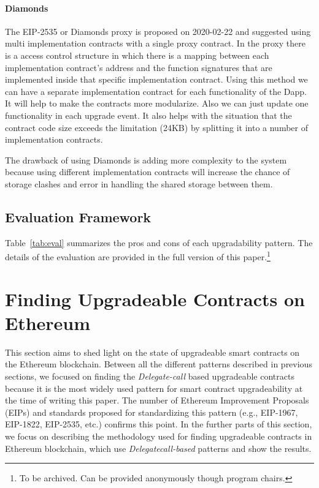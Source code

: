 \paragraph{Diamonds}
The EIP-2535 or Diamonds proxy is proposed on 2020-02-22 and suggested using multi implementation contracts with a single proxy contract. In the proxy there is a access control structure in which there is a mapping between each implementation contract's address and the function signatures that are implemented inside that specific implementation contract. Using this method we can have a separate implementation contract for each functionality of the Dapp. It will help to make the contracts more modularize. Also we can just update one functionality in each upgrade event. It also helps with the situation that the contract code size exceeds the limitation (24KB) by splitting it into a number of implementation contracts.

The drawback of using Diamonds is adding more complexity to the system because using different implementation contracts will increase the chance of storage clashes and error in handling the shared storage between them.




\subsection{Evaluation Framework}


Table~\ref{tab:eval} summarizes the pros and cons of each upgradability pattern. The details of the evaluation are provided in the full version of this paper.\footnote{To be archived. Can be provided anonymously though program chairs.}






 \section{Finding Upgradeable Contracts on Ethereum}

 This section aims to shed light on the state of upgradeable smart contracts on the Ethereum blockchain. Between all the different patterns described in previous sections, we focused on finding the \textit{Delegate-call} based upgradeable contracts because it is the most widely used pattern for smart contract upgradeability at the time of writing this paper. The number of Ethereum Improvement Proposals (EIPs) and standards proposed for standardizing this pattern (e.g., EIP-1967, EIP-1822, EIP-2535, etc.) confirms this point. In the further parts of this section, we focus on describing the methodology used for finding upgradeable contracts in Ethereum blockchain, which use \textit{Delegatecall-based} patterns and show the results. 


